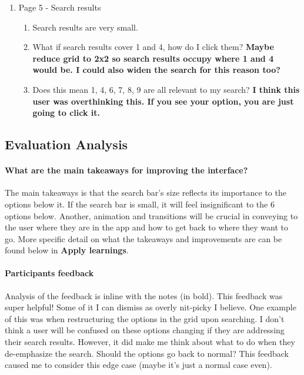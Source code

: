 \begin{enumerate}
\begin{enumerate}
  \end{enumerate}
\item
  Page 5 - Search results
  \begin{enumerate}
  \item
    Search results are very small.
  \item
    What if search results cover 1 and 4, how do I click them? \textbf{Maybe reduce grid to 2x2 so search results occupy where 1 and 4 would be. I could also widen the search for this reason too?}
  \item
    Does this mean 1, 4, 6, 7, 8, 9 are all relevant to my search? \textbf{I think this user was overthinking this. If you see your option, you are just going to click it.}
  \end{enumerate}
\end{enumerate}

\subsection{Evaluation Analysis}

\paragraph{What are the main takeaways for improving the interface?}
The main takeaways is that the search bar's size reflects its importance to the options below it. If the search bar is small, it will feel insignificant to the 6 options below. Another, animation and transitions will be crucial in conveying to the user where they are in the app and how to get back to where they want to go. More specific detail on what the takeaways and improvements are can be found below in \textbf{Apply learnings}.

\paragraph{Participants feedback} Analysis of the feedback is inline with the notes (in bold). This feedback was super helpful! Some of it I can dismiss as overly nit-picky I believe. One example of this was when restructuring the options in the grid upon searching. I don't think a user will be confused on these options changing if they are addressing their search results. However, it did make me think about what to do when they de-emphasize the search. Should the options go back to normal? This feedback caused me to consider this edge case (maybe it's just a normal case even).

